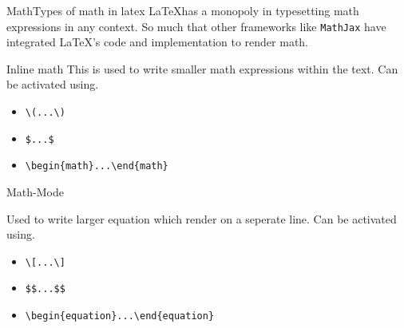 
\begin{frame}[fragile]{Math}{Types of math in latex}
	\footnotesize
    \LaTeX has a monopoly in typesetting math expressions in any context.
    So much that other frameworks like \texttt{MathJax} have integrated
    \LaTeX's code and implementation to render math.     \begin{block}{Inline math}
        This is used to write smaller math expressions within the text.
		Can be activated using.

		\begin{itemize}
		\item \begin{verbatim}\(...\)\end{verbatim}
		\item \begin{verbatim}$...$\end{verbatim}
		\item \begin{verbatim}\begin{math}...\end{math}\end{verbatim}
		\end{itemize}
    \end{block}

    \begin{block}{Math-Mode}

		Used to write larger equation which render on a seperate line.
		Can be activated using.

		\begin{itemize}
		\item \begin{verbatim}\[...\]\end{verbatim}
		\item \begin{verbatim}$$...$$\end{verbatim}
		\item \begin{verbatim}\begin{equation}...\end{equation}\end{verbatim}
		\end{itemize}
    \end{block}

\end{frame}


